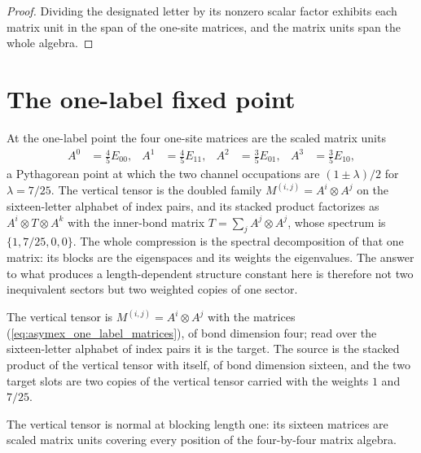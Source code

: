 \begin{proof}
    \leanok
    Dividing the designated letter by its nonzero scalar factor exhibits
    each matrix unit in the span of the one-site matrices, and the matrix
    units span the whole algebra.
\end{proof}

\section{The one-label fixed point}%
\label{sec:asymex_one_label}

At the one-label point the four one-site matrices are the scaled matrix
units
\begin{align}
    A^0 & =\tfrac45E_{00},
        & A^1
        & =\tfrac45E_{11},
        & A^2
        & =\tfrac35E_{01},
        & A^3
        & =\tfrac35E_{10},
    \label{eq:asymex_one_label_matrices}
\end{align}
a Pythagorean point at which the two channel occupations are
$(1\pm\lambda)/2$ for $\lambda=7/25$. The vertical tensor is the doubled
family $M^{(i,j)}=A^i\otimes A^j$ on the sixteen-letter alphabet of index
pairs, and its stacked product factorizes as $A^i\otimes T\otimes A^k$ with
the inner-bond matrix $T=\sum_jA^j\otimes A^j$, whose spectrum is
$\{1,7/25,0,0\}$. The whole compression is the spectral decomposition of
that one matrix: its blocks are the eigenspaces and its weights the
eigenvalues. The answer to what produces a length-dependent structure
constant here is therefore not two inequivalent sectors but two weighted
copies of one sector.

\begin{definition}
    \label{def:asymex_one_label}
    \leanok
    The vertical tensor is $M^{(i,j)}=A^i\otimes A^j$ with the matrices
    (\ref{eq:asymex_one_label_matrices}), of bond dimension four; read over
    the sixteen-letter alphabet of index pairs it is the target. The source
    is the stacked product of the vertical tensor with itself, of bond
    dimension sixteen, and the two target slots are two copies of the
    vertical tensor carried with the weights $1$ and $7/25$.
\end{definition}

\begin{theorem}
    \label{thm:asymex_one_label_normal}
    \leanok
    The vertical tensor is normal at blocking length one: its sixteen
    matrices are scaled matrix units covering every position of the
    four-by-four matrix algebra.
\end{theorem}


